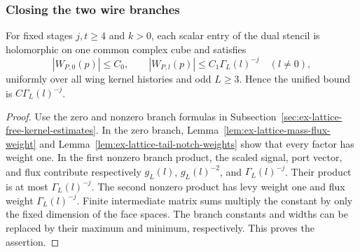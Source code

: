 \subsubsection{Closing the two wire branches}

\begin{proposition}
\label{prop:ex-lattice-wire-entrywise-bound}
For fixed stages $j,t\geq4$ and $k>0$, each scalar entry of the dual
stencil is holomorphic on one common complex cube and satisfies
\[
 |W_{P,0}(p)|\leq C_0,\qquad
 |W_{P,l}(p)|\leq C_1\Gamma_L(l)^{-j}\quad(l\ne0),
\]
uniformly over all wing kernel histories and odd $L\geq3$. Hence the unified bound is
$C\Gamma_L(l)^{-j}$.
\end{proposition}

\begin{proof}
Use the zero and nonzero branch formulas in
Subsection~\ref{sec:ex-lattice-free-kernel-estimates}. In the zero branch,
Lemma~\ref{lem:ex-lattice-mass-flux-weight} and
Lemma~\ref{lem:ex-lattice-tail-notch-weights} show that every factor has
weight one. In the first nonzero branch product, the scaled signal,
port vector, and flux contribute respectively
$g_L(l)$, $g_L(l)^{-2}$, and $\Gamma_L(l)^{-j}$. Their product is
at most $\Gamma_L(l)^{-j}$. The second nonzero product has levy weight
one and flux weight $\Gamma_L(l)^{-j}$. Finite intermediate matrix sums
multiply the constant by only the fixed dimension of the face spaces.
The branch constants and widths can be replaced by their maximum and
minimum, respectively. This proves the assertion.
\end{proof}
